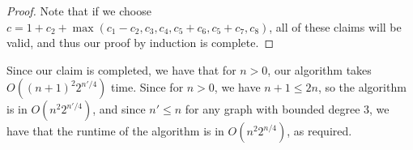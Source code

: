 \documentclass[answers]{exam}
\begin{document}
\begin{questions}
\begin{solution}
\begin{proof}
    Note that if we choose $c = 1 + c_2 + \max(c_1 - c_2, c_3, c_4, c_5 + c_6, c_5 + c_7, c_8)$, all of these claims will be valid, and thus our proof by induction is complete.
\end{proof}

Since our claim is completed, we have that for $n > 0$, our algorithm takes $O((n + 1)^2 2^{n'/4})$ time. Since for $n > 0$, we have $n + 1 \le 2n$, so the algorithm is in $O(n^2 2^{n'/4})$, and since
$n' \le n$ for any graph with bounded degree 3, we have that the runtime of the algorithm is in $O(n^2 2^{n / 4})$, as required.

\end{solution}

\end{questions}
\end{document}
